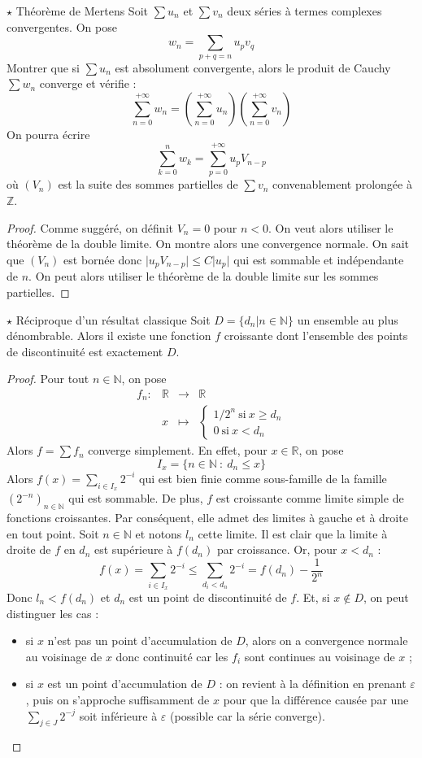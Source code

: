 \documentclass[french,a4paper]{article}
\newcommand{\N}{\mathbb{N}}
\newcommand{\Z}{\mathbb{Z}}
\newcommand{\R}{\mathbb{R}}
\theoremstyle{plain}
\theoremstyle{definition}
\theoremstyle{remark}
\begin{document}
\begin{ex}{$\star$ Théorème de Mertens}
	Soit $\sum u_n$ et $\sum v_n$ deux séries à termes complexes convergentes. On pose $$w_n=\sum_{p+q=n}u_p v_q$$ Montrer que si $\sum u_n$ est absolument convergente, alors le produit de Cauchy $\sum w_n$ converge et vérifie : $$\sum_{n=0}^{+\infty}w_n=\left(\sum_{n=0}^{+\infty}u_n\right)\left(\sum_{n=0}^{+\infty}v_n\right)$$ On pourra écrire $$\sum_{k=0}^{n}w_k=\sum_{p=0}^{+\infty}u_pV_{n-p}$$ où $(V_n)$ est la suite des sommes partielles de $\sum v_n$ convenablement prolongée à $\Z$.
\end{ex}
\begin{proof}
	Comme suggéré, on définit $V_n=0$ pour $n<0$. On veut alors utiliser le théorème de la double limite. On montre alors une convergence normale. On sait que $(V_n)$ est bornée donc $\lvert u_pV_{n-p}\rvert\leqslant C\lvert u_p\rvert$ qui est sommable et indépendante de $n$. On peut alors utiliser le théorème de la double limite sur les sommes partielles.
\end{proof}
\begin{ex}{$\star$ Réciproque d'un résultat classique}
	Soit $D=\{d_n| n\in\N\}$ un ensemble au plus dénombrable. Alors il existe une fonction $f$ croissante dont l'ensemble des points de discontinuité est exactement $D$.
\end{ex}
\begin{proof}
	Pour tout $n\in\N$, on pose $$\begin{array}{lrcl}
		f_n:&\R&\longrightarrow&\R \\
		&x&\longmapsto&\begin{cases}
			1/2^n\ \text{si} \ x\geqslant d_n \\
			0\ \text{si} \ x<d_n
		\end{cases}
	\end{array}$$ Alors $f=\sum f_n$ converge simplement. En effet, pour $x\in\R$, on pose $$I_x=\{n\in\N\ : \ d_n\leqslant x\}$$ Alors $f(x)=\sum_{i\in I_x}2^{-i}$ qui est bien finie comme sous-famille de la famille $(2^{-n})_{n\in\N}$ qui est sommable. De plus, $f$ est croissante comme limite simple de fonctions croissantes. Par conséquent, elle admet des limites à gauche et à droite en tout point. Soit $n\in\N$ et notons $l_n$ cette limite. Il est clair que la limite à droite de $f$ en $d_n$ est supérieure à $f(d_n)$ par croissance. Or, pour $x<d_n$ : $$f(x)=\sum_{i\in I_x}2^{-i}\leqslant\sum_{d_i<d_n}2^{-i}=f(d_n)-\frac{1}{2^n}$$ Donc $l_n<f(d_n)$ et $d_n$ est un point de discontinuité de $f$. Et, si $x\notin D$, on peut distinguer les cas : 
	\begin{itemize}
		\item si $x$ n'est pas un point d'accumulation de $D$, alors on a convergence normale au voisinage de $x$ donc continuité car les $f_i$ sont continues au voisinage de $x$ ;
		\item si $x$ est un point d'accumulation de $D$ : on revient à la définition en prenant $\varepsilon$, puis on s'approche suffisamment de $x$ pour que la différence causée par une $\sum_{j\in J}2^{-j}$ soit inférieure à $\varepsilon$ (possible car la série converge). 
	\end{itemize}
\end{proof}
\end{document}
